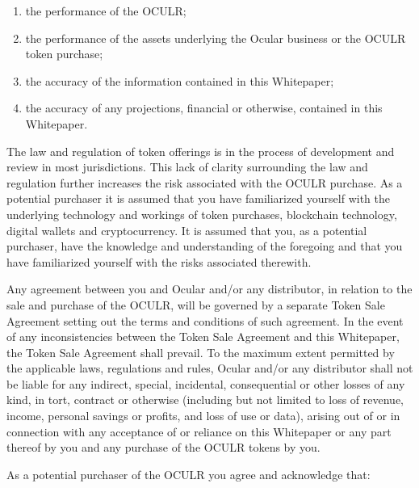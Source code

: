 \documentclass[a4paper]{article}
\begin{document}
\begin{enumerate}
\item the performance of the OCULR;
\item the performance of the assets underlying the Ocular business or the OCULR token purchase;
\item the accuracy of the information contained in this Whitepaper;
\item the accuracy of any projections, financial or otherwise, contained in this Whitepaper.
\end{enumerate}

The law and regulation of token offerings is in the process of development and review in most jurisdictions. This lack of clarity surrounding the law and regulation further increases the risk associated with the OCULR purchase. As a potential purchaser it is assumed that you have familiarized yourself with the underlying technology and workings of token purchases, blockchain technology, digital wallets and cryptocurrency. It is assumed that you, as a potential purchaser, have the knowledge and understanding of the foregoing and that you have familiarized yourself with the risks associated therewith.

Any agreement between you and Ocular and/or any distributor, in relation to the sale and purchase of the OCULR, will be governed by a separate Token Sale Agreement setting out the terms and conditions of such agreement. In the event of any inconsistencies between the Token Sale Agreement and this Whitepaper, the Token Sale Agreement shall prevail. To the maximum extent permitted by the applicable laws, regulations and rules, Ocular and/or any distributor shall not be liable for any indirect, special, incidental, consequential or other losses of any kind, in tort, contract or otherwise (including but not limited to loss of revenue, income, personal savings or profits, and loss of use or data), arising out of or in connection with any acceptance of or reliance on this Whitepaper or any part thereof by you and any purchase of the OCULR tokens by you.

As a potential purchaser of the OCULR you agree and acknowledge that:
\end{document}
